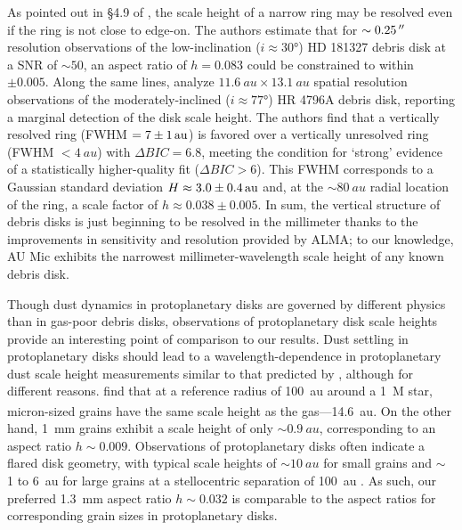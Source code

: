 \documentclass[modern]{aastex62}
\begin{document}
As pointed out in \S 4.9 of \citet{marino16}, the scale height of a narrow ring may be resolved even if the ring is not close to edge-on.
The authors estimate that for $\sim \SI{0.25}{\mbox{$^{\prime\prime}$}}$ resolution observations of the low-inclination ($i \approx \ang{30}$) HD 181327 debris disk at a SNR of $\sim 50$, an aspect ratio of $h=0.083$ could be constrained to within $\pm 0.005$. 
Along the same lines, \citet{kennedy18} analyze $\SI{11.6}{au} \times \SI{13.1}{au}$ spatial resolution observations of the moderately-inclined ($i \approx \ang{77}$) HR 4796A debris disk, reporting a marginal detection of the disk scale height.
The authors find that a vertically resolved ring (FWHM $= \SI{7 \pm 1}{au}$) is favored over a vertically unresolved ring (FWHM $< \SI{4}{au}$) with $\Delta BIC = 6.8$, meeting the condition for `strong' evidence of a statistically higher-quality fit ($\Delta BIC > 6$). 
This FWHM corresponds to a Gaussian standard deviation $H \approx \SI{3.0 \pm 0.4}{au}$ and, at the $\sim \SI{80}{au}$ radial location of the ring, a scale factor of $h \approx 0.038 \pm 0.005$.
In sum, the vertical structure of debris disks is just beginning to be resolved in the millimeter thanks to the improvements in sensitivity and resolution provided by ALMA; to our knowledge, AU Mic exhibits the narrowest millimeter-wavelength scale height of any known debris disk.


Though dust dynamics in protoplanetary disks are governed by different physics than in gas-poor debris disks, observations of protoplanetary disk scale heights provide an interesting point of comparison to our results.
Dust settling in protoplanetary disks should lead to a wavelength-dependence in protoplanetary dust scale height measurements similar to that predicted by \citet{thebault09}, although for different reasons.
\citet{boehler13} find that at a reference radius of \SI{100}{au} around a \SI{1}{M_\sun} star, micron-sized grains have the same scale height as the gas---\SI{14.6}{au}.
On the other hand, \SI{1}{mm} grains exhibit a scale height of only $\sim \SI{0.9}{au}$, corresponding to an aspect ratio $h \sim 0.009$.
Observations of protoplanetary disks often indicate a flared disk geometry, with typical scale heights of $\sim \SI{10}{au}$ for small grains and $\sim$ 1 to \SI{6}{au} for large grains at a stellocentric separation of \SI{100}{au} \citep{pinte08,pinte16,graffe13}.
As such, our preferred \SI{1.3}{mm} aspect ratio $h \sim 0.032$ is comparable to the aspect ratios for corresponding grain sizes in protoplanetary disks.
\end{document}
